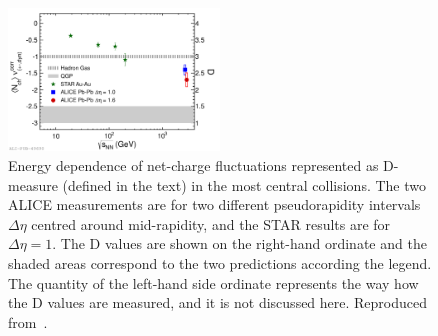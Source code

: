 \begin{figure}
\centering
\includegraphics[width=0.5\textwidth]{ksfigures/NetChargeFluct.pdf}
\caption{Energy dependence of net-charge fluctuations represented as D-measure (defined in the text) in the most central collisions. The two ALICE measurements are for two different pseudorapidity intervals $\Delta\eta$ centred around mid-rapidity, and the STAR results are for $\Delta\eta = 1$. The D values are shown on the right-hand ordinate and the shaded areas correspond to the two predictions according the legend. The quantity of the left-hand side ordinate represents the way how the D values are measured, and it is not discussed here. Reproduced from~\cite{Abelev:2012pv}.}
\label{figks:ChargeFluct}
\end{figure}

